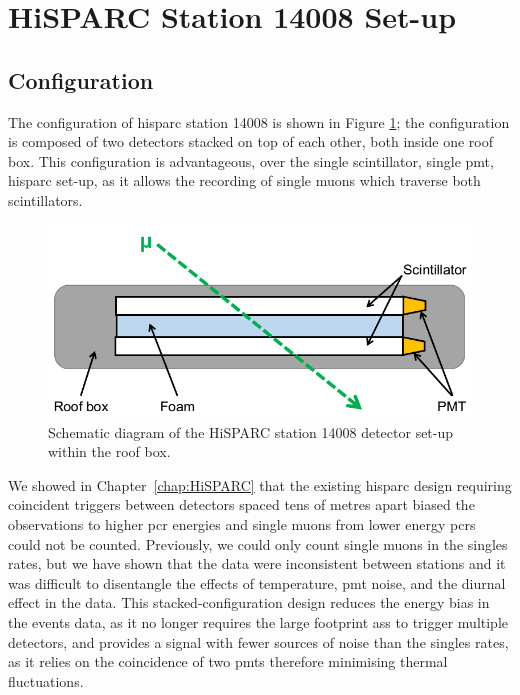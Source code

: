 \section{HiSPARC Station 14008 Set-up}\label{sec:HiSPARC_14008}


\subsection{Configuration}

The configuration of \gls{hisparc} station 14008 is shown in Figure \ref{fig:14008_config}; the configuration is composed of two detectors stacked on top of each other, both inside one roof box. This configuration is advantageous, over the single scintillator, single \gls{pmt}, \gls{hisparc} set-up, as it allows the recording of single muons which traverse both scintillators. 


\begin{figure}[ht!]
	\center
	\includegraphics[width=0.75\columnwidth]{14008_config.png}
	\caption{Schematic diagram of the HiSPARC station 14008 detector set-up within the roof box.}
	\label{fig:14008_config}
\end{figure}

We showed in Chapter~\ref{chap:HiSPARC} that the existing \gls{hisparc} design requiring coincident triggers between detectors spaced tens of metres apart biased the observations to higher \gls{pcr} energies and single muons from lower energy \glspl{pcr} could not be counted. Previously, we could only count single muons in the singles rates, but we have shown that the data were inconsistent between stations and it was difficult to disentangle the effects of temperature, \gls{pmt} noise, and the diurnal effect in the data. This stacked-configuration design reduces the energy bias in the events data, as it no longer requires the large footprint \glspl{as} to trigger multiple detectors, and provides a signal with fewer sources of noise than the singles rates, as it relies on the coincidence of two \glspl{pmt} therefore minimising thermal fluctuations.

